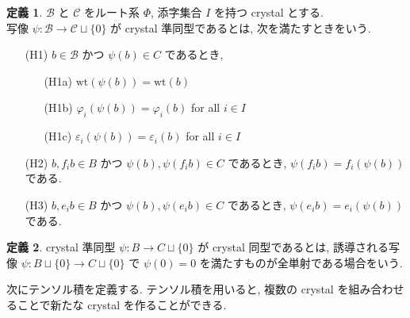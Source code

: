 \documentclass[
  a4paper, 
  12pt,
  ja=standard,
  xelatex,
  left=30truemm,
  right=30truemm,
  titlepage 
]{bxjsarticle}
\theoremstyle{definition}
\newtheorem{df}{定義}[section]
\begin{document}
\begin{df}  
  $\mathcal{B}$ と $\mathcal{C}$ をルート系 $\Phi$, 添字集合 $I$ を持つ crystal とする. \\
  写像 $ \psi : \mathcal{B} \to \mathcal{C} \sqcup \{ 0 \}$ が crystal 準同型であるとは, 次を満たすときをいう.
  \begin{enumerate}
    \item[(H1)] $b \in \mathcal{B}$ かつ $\psi(b) \in C$ であるとき, 
      \begin{enumerate}
        \item[(H1a)] $\mathrm{wt}(\psi(b)) = \mathrm{wt}(b)$
        \item[(H1b)] $\varphi_i(\psi(b)) = \varphi_i(b)$ \quad for all $i \in I$
        \item[(H1c)] $\varepsilon_i(\psi(b)) = \varepsilon_i(b)$ \quad for all $i \in I$
      \end{enumerate}
    \item[(H2)] $b, f_i b \in B$ かつ $\psi(b), \psi(f_i b) \in C$ であるとき, $\psi(f_i b) = f_i(\psi(b))$ である.
    \item[(H3)] $b, e_i b \in B$ かつ $\psi(b), \psi(e_i b) \in C$ であるとき, $\psi(e_i b) = e_i(\psi(b))$ である.
  \end{enumerate}
\end{df}

\begin{df}
  crystal 準同型 $\psi : B \to C \sqcup \{ 0 \}$ が crystal 同型であるとは,
  誘導される写像 $\psi : B \sqcup \{ 0 \} \to C \sqcup \{ 0 \}$ で $\psi(0) = 0$ を満たすものが全単射である場合をいう.
\end{df}

次にテンソル積を定義する.
テンソル積を用いると, 複数の crystal を組み合わせることで新たな crystal を作ることができる. 
\end{document}
